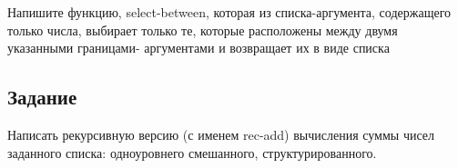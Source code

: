 Напишите функцию, select-between, которая из списка-аргумента, содержащего только числа, выбирает только те, которые расположены между двумя указанными границами- аргументами и возвращает их в виде списка


\subsection{Задание }

Написать рекурсивную версию (с именем rec-add) вычисления суммы чисел заданного списка: одноуровнего смешанного, структурированного.

